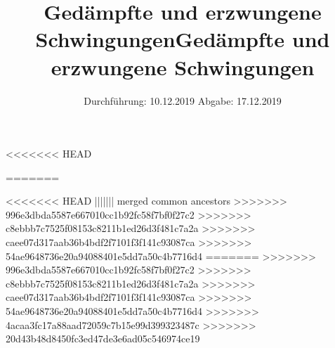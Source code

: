 
<<<<<<< HEAD
\subject{Versuch 354}
\title{Gedämpfte und erzwungene Schwingungen}
=======

\subject{Versuch 354}
\title{Gedämpfte und erzwungene Schwingungen}
<<<<<<< HEAD
||||||| merged common ancestors
>>>>>>> 996e3dbda5587e667010cc1b92fc58f7bf0f27c2
>>>>>>> c8ebbb7c7525f08153c8211b1ed26d3f481c7a2a
>>>>>>> caee07d317aab36b4bdf2f7101f3f141c93087ca
>>>>>>> 54ae9648736e20a94088401e5dd7a50c4b7716d4
=======
>>>>>>> 996e3dbda5587e667010cc1b92fc58f7bf0f27c2
>>>>>>> c8ebbb7c7525f08153c8211b1ed26d3f481c7a2a
>>>>>>> caee07d317aab36b4bdf2f7101f3f141c93087ca
>>>>>>> 54ae9648736e20a94088401e5dd7a50c4b7716d4
>>>>>>> 4acaa3fc17a88aad72059c7b15e99d399323487c
>>>>>>> 20d43b48d8450fc3ed47de3e6ad05c546974ce19
\date{%
  Durchführung: 10.12.2019
  \hspace{3em}
  Abgabe: 17.12.2019
}



\maketitle
\thispagestyle{empty}
\tableofcontents
\newpage






\nocite{*}
\printbibliography{}


